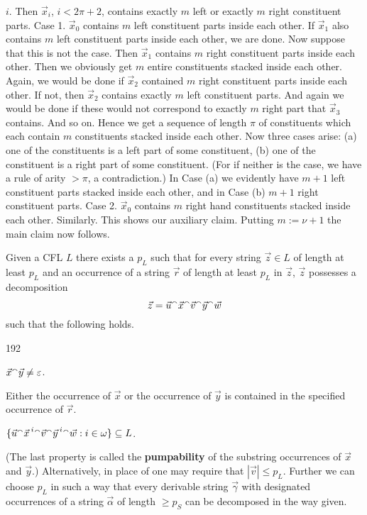 $i$. Then $\vec{x}_i$, $i < 2\pi + 2$, contains exactly $m$ left or 
exactly $m$ right constituent parts.
Case 1. $\vec{x}_0$ contains $m$ left constituent parts inside
each other. If $\vec{x}_1$ also contains $m$ left constituent
parts inside each other, we are done. Now suppose that this is
not the case. Then $\vec{x}_1$ contains $m$ right constituent
parts inside each other.  Then we obviously get $m$ entire
constituents stacked inside each other. Again, we would be done
if $\vec{x}_2$ contained $m$ right constituent parts inside
each other. If not, then $\vec{x}_2$ contains exactly $m$ left
constituent parts. And again we would be done if these would
not correspond to exactly $m$ right part that $\vec{x}_3$
contains. And so on. Hence we get a sequence of length $\pi$
of constituents which each contain $m$ constituents stacked
inside each other. Now three cases arise: (a) one of the 
constituents is a left part of some constituent, (b) one of 
the constituent is a right part of some constituent. (For if 
neither is the case, we have a rule of arity $> \pi$, a 
contradiction.) In Case (a) we evidently have $m+1$ left 
constituent parts stacked inside each other, and in Case (b) 
$m+1$ right constituent parts. Case 2. $\vec{x}_0$ contains $m$
right hand constituents stacked inside each other. Similarly.
This shows our auxiliary claim. Putting $m := \nu + 1$ the main
claim now follows.
\proofend
\begin{thm}
\label{thm:pumplemma}
Given a CFL $L$ there exists a $p_L$ such that
for every string $\vec{z} \in L$ of length at least $p_L$ and an
occurrence of a string $\vec{r}$  of length at least $p_L$ in
$\vec{z}$, $\vec{z}$ possesses a decomposition
\begin{equation}
\vec{z} = \vec{u} {^{\smallfrown}} \vec{x} {^{\smallfrown}} \vec{v}
{^{\smallfrown}} \vec{y} {^{\smallfrown}} \vec{w}
\end{equation}
such that the following holds.
\begin{dingautolist}{192}
\item
$\vec{x} {^{\smallfrown}} \vec{y} \neq \varepsilon$. 
\item
Either the occurrence of $\vec{x}$ or the occurrence of
$\vec{y}$ is contained in the specified occurrence of $\vec{r}$.
\item
$\{\vec{u} {^{\smallfrown}} {\vec{x}\,}^i {^{\smallfrown}} \vec{v} {^{\smallfrown}} {\vec{y}\,}^i
{^{\smallfrown}} \vec{w} : i \in \omega\} \subseteq L$.
\end{dingautolist}
(The last property is called the \textbf{pumpability} of the
substring occurrences of $\vec{x}$ and $\vec{y}$.) Alternatively, 
in place of  one may require that $|\vec{v}| \leq p_L$. 
Further we can choose $p_L$ in such a way that every derivable
string $\vec{\gamma}$ with designated occurrences of a string
$\vec{\alpha}$ of length $\geq p_S$ can be decomposed in the way
given.
\end{thm}
